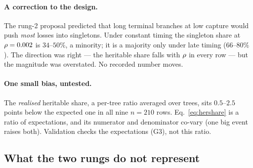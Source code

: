 \paragraph{A correction to the design.} The rung-2 proposal predicted that long terminal branches at low
capture would push \emph{most} losses into singletons. Under constant timing the singleton share at
$\rho=0.002$ is $34$--$50\%$, a minority; it is a majority only under late timing ($66$--$80\%$). The
direction was right --- the heritable share falls with $\rho$ in every row --- but the magnitude was
overstated. No recorded number moves.

\paragraph{One small bias, untested.} The \emph{realised} heritable share, a per-tree ratio averaged over
trees, sits $0.5$--$2.5$ points below the expected one in all nine $n=210$ rows. Eq.~\eqref{eq:hershare}
is a ratio of expectations, and its numerator and denominator co-vary (one big event raises both).
Validation checks the expectations (G3), not this ratio.

\subsection{What the two rungs do not represent}\label{sec:dropnot}

